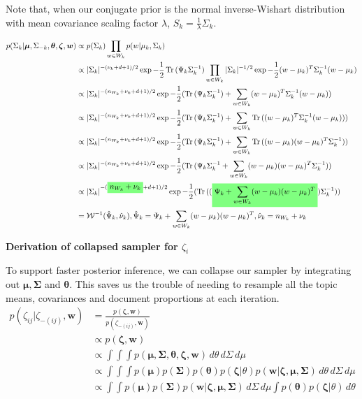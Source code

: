 \documentclass[12pt]{article}
\newcommand{\ghighlight}[1]{%
  \colorbox{green!50}{$\displaystyle#1$}}
\DeclareMathOperator{\Tr}{Tr}
\begin{document}
Note that, when our conjugate prior is the normal inverse-Wishart distribution with mean covariance scaling factor $\lambda$, $S_k = \frac{1}{\lambda}\Sigma_k$.

\begin{align*}
p(\Sigma_k | \bm{\mu}, \Sigma_{-k}, \bm{\theta}, \bm{\zeta}, \bm{w}) & \propto p(\Sigma_k) \prod_{w \in W_k} p(w | \mu_k, \Sigma_k) \\
& \propto |\Sigma_k|^{-(\nu_k + d + 1)/2} \exp{-\frac{1}{2} \Tr{(\Psi_k\Sigma_k^{-1})}}\prod_{w \in W_k} |\Sigma_k|^{-1/2} \exp{-\frac{1}{2}(w - \mu_k)^T\Sigma_k^{-1}(w - \mu_k)} \\
& \propto |\Sigma_k|^{-(n_{W_k} + \nu_k + d + 1)/2} \exp{-\frac{1}{2} (\Tr{(\Psi_k\Sigma_k^{-1})} + \sum_{w \in W_k} (w - \mu_k)^T\Sigma_k^{-1}(w - \mu_k))} \\
& \propto |\Sigma_k|^{-(n_{W_k} + \nu_k + d + 1)/2} \exp{-\frac{1}{2} (\Tr{(\Psi_k\Sigma_k^{-1})} + \sum_{w \in W_k} \Tr{((w - \mu_k)^T\Sigma_k^{-1}(w - \mu_k))})} \\
& \propto |\Sigma_k|^{-(n_{W_k} + \nu_k + d + 1)/2} \exp{-\frac{1}{2} (\Tr{(\Psi_k\Sigma_k^{-1})} + \sum_{w \in W_k} \Tr{((w - \mu_k)(w - \mu_k)^T\Sigma_k^{-1})})} \\
& \propto |\Sigma_k|^{-(n_{W_k} + \nu_k + d + 1)/2} \exp{-\frac{1}{2} (\Tr{(\Psi_k\Sigma_k^{-1} + \sum_{w \in W_k} (w - \mu_k)(w - \mu_k)^T\Sigma_k^{-1})})} \\
& \propto |\Sigma_k|^{-(\ghighlight{n_{W_k} + \nu_k} + d + 1)/2} \exp{-\frac{1}{2} (\Tr{((\ghighlight{\Psi_k + \sum_{w \in W_k} (w - \mu_k)(w - \mu_k)^T})\Sigma_k^{-1})})} \\
& = \mathcal{W}^{-1}(\hat{\Psi}_k, \hat{\nu}_k), \hat{\Psi}_k = \Psi_k + \sum_{w \in W_k} (w - \mu_k)(w - \mu_k)^T, \hat{\nu}_k = n_{W_k} + \nu_k 
\end{align*}

\textbf{Derivation of collapsed sampler for $\zeta_{i}$}

To support faster posterior inference, we can collapse our sampler by integrating out $\bm{\mu}, \bm{\Sigma}$ and $\bm{\theta}$.  This saves us the trouble of needing to resample all the topic means, covariances and document proportions at each iteration.
\begin{align*}
p(\zeta_{ij} | \zeta_{-(ij)}, \bm{w}) & = \frac{p(\bm{\zeta}, \bm{w})}{p(\zeta_{-(ij)}, \bm{w})} \\
& \propto p(\bm{\zeta}, \bm{w}) \\
& \propto \int \int \int p(\bm{\mu}, \bm{\Sigma}, \bm{\theta}, \bm{\zeta}, \bm{w}) \,d\theta \,d\Sigma \,d\mu \\
& \propto \int \int \int p(\bm{\mu})p(\bm{\Sigma})p(\bm{\theta})p(\bm{\zeta} | \theta)p(\bm{w} | \bm{\zeta}, \bm{\mu}, \bm{\Sigma}) \,d\theta \,d\Sigma \,d\mu \\
& \propto \int \int p(\bm{\mu})p(\bm{\Sigma})p(\bm{w} | \bm{\zeta}, \bm{\mu}, \bm{\Sigma})\,d\Sigma \,d\mu \int p(\bm{\theta})p(\bm{\zeta} | \theta) \,d\theta 
\end{align*}
\end{document}
